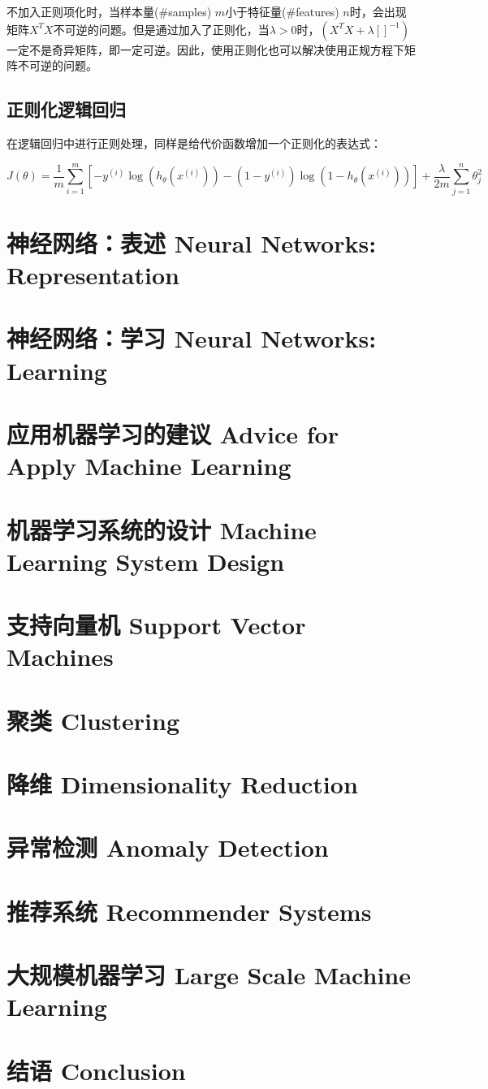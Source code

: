 \documentclass[12pt, a4paper]{article}
\begin{document}
不加入正则项化时，当样本量($\#$samples) $m$小于特征量($\#$features) $n$时，会出现矩阵$X^TX$不可逆的问题。但是通过加入了正则化，当$\lambda>0$时，$(X^TX+\lambda[ ]^{-1})$一定不是奇异矩阵，即一定可逆。因此，使用正则化也可以解决使用正规方程下矩阵不可逆的问题。

\subsection{正则化逻辑回归}

在逻辑回归中进行正则处理，同样是给代价函数增加一个正则化的表达式：

\begin{equation*}
    J(\theta)=\frac{1}{m}\sum_{i=1}^{m}\left[-y^{(i)}\log\left(h_\theta(x^{(i)})\right)-(1-y^{(i)})\log\left(1-h_\theta(x^{(i)})\right)\right]+\frac{\lambda}{2m}\sum_{j=1}^{n}\theta_j^2
\end{equation*}

\section{神经网络：表述 Neural Networks: Representation}

\section{神经网络：学习 Neural Networks: Learning}

\section{应用机器学习的建议 Advice for Apply Machine Learning}

\section{机器学习系统的设计 Machine Learning System Design}

\section{支持向量机 Support Vector Machines}

\section{聚类 Clustering}

\section{降维 Dimensionality Reduction}

\section{异常检测 Anomaly Detection}

\section{推荐系统 Recommender Systems}

\section{大规模机器学习 Large Scale Machine Learning}

\section{结语 Conclusion}
\end{document}
